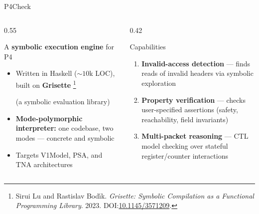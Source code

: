 \documentclass[aspectratio=169]{beamer}
\newcommand{\grisetteframecite}{%
  \footnote[frame]{%
    Sirui Lu and Rastislav Bod\'{\i}k. \emph{Grisette: Symbolic Compilation as a Functional Programming Library}. 2023.
    DOI:\space\href{https://doi.org/10.1145/3571209}{10.1145/3571209}.%
  }%
}
\begin{document}
\begin{frame}{P4Check}                                           
                                                                                
  \begin{columns}[T]                                                            
                                                                                
  \begin{column}{0.55\textwidth}                                                
                                                                                
  A \textbf{symbolic execution engine} for P4                                          
  \begin{itemize}\setlength\itemsep{2pt}                                        
    \item Written in Haskell (${\sim}10$k LOC), built on \textbf{Grisette}\grisetteframecite
  (a symbolic evaluation library)                                              
    \item \textbf{Mode-polymorphic interpreter:} one codebase, two modes ---    
  concrete and symbolic                          
    \item Targets V1Model, PSA, and TNA architectures                          
  \end{itemize}                                                                 
                                                                                
  \end{column}                                                                  
  
  \begin{column}{0.42\textwidth}                                                
                                                                           
  \begin{block}{Capabilities}
  \small
  \begin{enumerate}\setlength\itemsep{3pt}
    \item[\checkmark] \textbf{Invalid-access detection} --- finds reads of      
  invalid headers via symbolic exploration                                      
    \item[\checkmark] \textbf{Property verification} --- checks user-specified
  assertions (safety, reachability, field invariants)                           
    \item[\checkmark] \textbf{Multi-packet reasoning} --- CTL model checking
  over stateful register/counter interactions
  

\end{enumerate}
\end{block}
\end{column}
\end{columns}
\end{frame}
\end{document}
